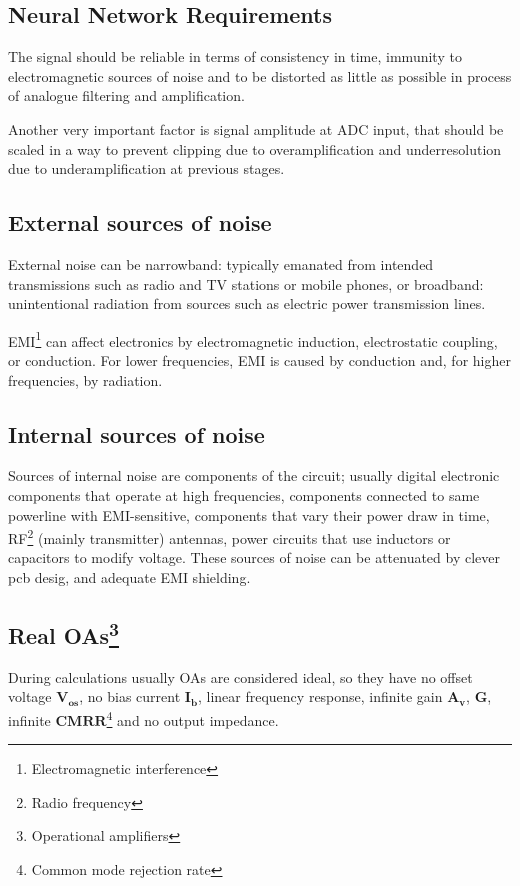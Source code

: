 \documentclass[a4paper, 10pt]{article} %
\newcommand{\mathbff}[1]{$\boldsymbol{#1}$}
\newcommand{\parenciteit}[2]{\textit{\parencite[#1]{#2}}} %
\begin{document}
    \subsection*{Neural Network Requirements}
    \hspace{\parindent}The signal should be reliable in terms of consistency in time, immunity to electromagnetic sources of noise and to be distorted as little as possible in process of analogue filtering and amplification. \parenciteit{}{OA:Wiki}
    
     Another very important factor is signal amplitude at ADC input, that should be scaled in a way to prevent clipping due to overamplification and underresolution due to underamplification at previous stages.

    \subsection*{External sources of noise}
    \hspace{\parindent}External noise can be narrowband: typically emanated from intended transmissions such as radio and TV stations or mobile phones, or broadband: unintentional radiation from sources such as electric power transmission lines.

    \noindent EMI\footnote{Electromagnetic interference} can affect electronics by electromagnetic induction, electrostatic coupling, or conduction. For lower frequencies, EMI is caused by conduction and, for higher frequencies, by radiation. \parenciteit{}{EMI:Wiki}

    \subsection*{Internal sources of noise}
    \hspace{\parindent}Sources of internal noise are components of the circuit; usually digital electronic components that operate at high frequencies, components connected to same powerline with EMI{-}sensitive, components that vary their power draw in time, RF\footnote{Radio frequency} (mainly transmitter) antennas, power circuits that use inductors or capacitors to modify voltage. These sources of noise can be attenuated by clever pcb desig, and adequate EMI shielding.

    \subsection*{Real OAs\footnote{Operational amplifiers}}
    \hspace{\parindent}During calculations usually OAs are considered ideal, so they have no offset voltage \mathbff{V_{os}}, no bias current \mathbff{I_{b}}, linear frequency response, infinite gain \mathbff{A_{v}}, \mathbff{G}, infinite \mathbff{CMRR}\footnote{Common mode rejection rate} and no output impedance.
    
\end{document}
